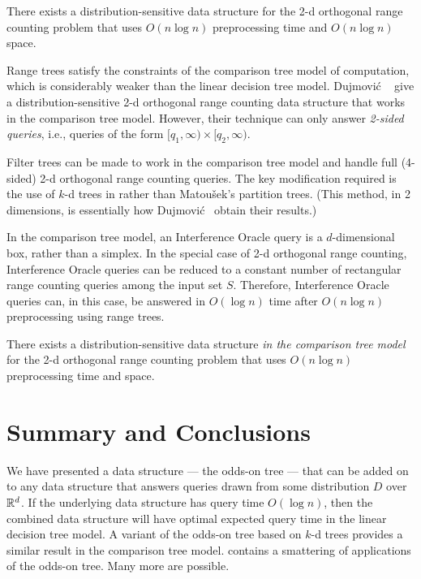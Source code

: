 \documentclass{patmorin}
\begin{document}
\begin{thm}
  There exists a distribution-sensitive data structure for the 2-d
  orthogonal range counting problem that uses $O(n\log n)$ preprocessing
  time and $O(n\log n)$ space.
\end{thm}

Range trees satisfy the constraints of the comparison tree model of
computation, which is considerably weaker than the linear decision tree
model. Dujmovi\'c \etal\ \cite{dhm09} give a distribution-sensitive 2-d
orthogonal range counting data structure that works in the comparison
tree model.  However, their technique can only answer \emph{2-sided
queries}, i.e., queries of the form $[q_1,\infty)\times[q_2,\infty)$.

Filter trees can be made to work in the comparison tree model
and handle full (4-sided) 2-d orthogonal range counting queries.
The key modification required is the use of $k$-d trees in
 rather than Matou\v{s}ek's partition
trees. (This method, in 2 dimensions, is essentially how Dujmovi\'c \etal\
obtain their results.)

In the comparison tree model, an Interference Oracle query is a
$d$-dimensional box, rather than a simplex. In the special case of 2-d
orthogonal range counting, Interference Oracle queries can be reduced to
a constant number of rectangular range counting queries among the input
set $S$.  Therefore, Interference Oracle queries can, in this case,
be answered in $O(\log n)$ time after $O(n\log n)$ preprocessing using
range trees.

\begin{thm}
  There exists a distribution-sensitive data structure \emph{in the
  comparison tree model} for the 2-d orthogonal range counting problem
  that uses $O(n\log n)$ preprocessing time and space.
\end{thm}

\section{Summary and Conclusions}

We have presented a data structure --- the odds-on tree --- that can
be added on to any data structure that answers queries drawn from some
distribution $D$ over $\mathbb{R}^d$.  If the underlying data structure has query
time $O(\log n)$, then the combined data structure will have optimal
expected query time in the linear decision tree model.  A variant of
the odds-on tree based on $k$-d trees provides a similar result in the
comparison tree model.  \secref{applications} contains a smattering of
applications of the odds-on tree.  Many more are possible.
\end{document}
